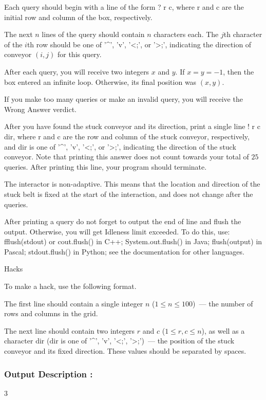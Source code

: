 \documentclass{article}
\begin{document}
Each query should begin with a line of the form ? r c, where r and c are the initial row and column of the box, respectively.

The next $n$ lines of the query should contain $n$ characters each. The $j$th character of the $i$th row should be one of '^', 'v', '<;', or '>;', indicating the direction of conveyor $(i, j)$ for this query.

After each query, you will receive two integers $x$ and $y$. If $x = y = -1$, then the box entered an infinite loop. Otherwise, its final position was $(x, y)$.

If you make too many queries or make an invalid query, you will receive the Wrong Answer verdict.

After you have found the stuck conveyor and its direction, print a single line ! r c dir, where r and c are the row and column of the stuck conveyor, respectively, and dir is one of '^', 'v', '<;', or '>;', indicating the direction of the stuck conveyor. Note that printing this answer does not count towards your total of $25$ queries. After printing this line, your program should terminate.

The interactor is non-adaptive. This means that the location and direction of the stuck belt is fixed at the start of the interaction, and does not change after the queries.

After printing a query do not forget to output the end of line and flush the output. Otherwise, you will get Idleness limit exceeded. To do this, use:  fflush(stdout) or cout.flush() in C++;  System.out.flush() in Java;  flush(output) in Pascal;  stdout.flush() in Python;  see the documentation for other languages. 

Hacks

To make a hack, use the following format.

The first line should contain a single integer $n$ ($1 \le n \le 100$) — the number of rows and columns in the grid.

The next line should contain two integers $r$ and $c$ ($1 \le r, c \le n$), as well as a character $\mathrm{dir}$ ($\mathrm{dir}$ is one of '^', 'v', '<;', '>;') — the position of the stuck conveyor and its fixed direction. These values should be separated by spaces.
\paragraph{}
\subsubsection*{Output Description : }3
\end{document}
